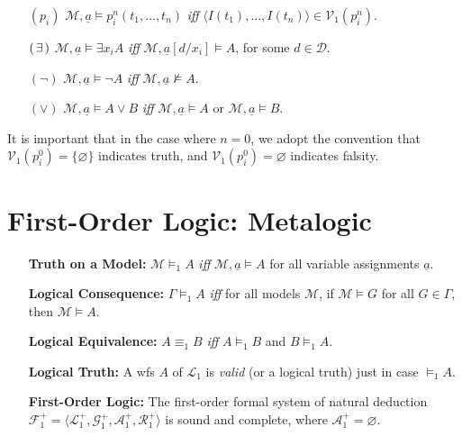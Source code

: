 \documentclass[a4paper, 11pt]{article} %
\newcommand{\tuple}[1]{\langle#1\rangle} %
\newcommand{\set}[1]{\lbrace#1\rbrace} %
\newcommand{\M}[0]{\mathcal{M}}
\newcommand{\V}[0]{\mathcal{V}}
\renewcommand{\L}[0]{\mathcal{L}}
\begin{document}
\begin{enumerate}[leftmargin=1.2in,labelsep=.15in]
\begin{small}
\begin{itemize}[leftmargin=.36in]
\item[$(p_i)$] $\mathcal{M},\underline{a}\vDash  p_i^n(t_1,\dots,t_n)$ \textit{iff} $\tuple{I(t_1),\dots,I(t_n)}\in \V_1(p_i^n)$.
\item[$(\hspace{1.5pt}\exists\hspace{1.5pt})$] $\mathcal{M},\underline{a}\vDash  \exists x_iA$ \textit{iff} $\mathcal{M},\underline{a}[d/x_i]\vDash A$, for some $d\in\mathcal{D}$.
\item[$(\neg)$] $\mathcal{M},\underline{a}\vDash  \neg A$ \textit{iff} $\mathcal{M},\underline{a}\nvDash A$.
\item[$(\vee)$] $\mathcal{M},\underline{a}\vDash  A\vee B$ \textit{iff} $\mathcal{M},\underline{a}\vDash  A$ or $\mathcal{M},\underline{a}\vDash  B$.
\end{itemize}
\end{small}
It is important that in the case where $n=0$, we adopt the convention that $\V_1(p_i^0)=\set{\varnothing}$ indicates truth, and $\V_1(p_i^0)=\varnothing$ indicates falsity.
\end{enumerate}



\section*{\sc First-Order Logic: Metalogic}%

\begin{enumerate}[leftmargin=1.2in,labelsep=.15in] %
\item[\bf Truth on a Model:] $\M\vDash_1 A$ \textit{iff} $\mathcal{M},\underline{a}\vDash A$ for all variable assignments $\underline{a}$.
\item[\bf Logical Consequence:] $\Gamma\vDash_1 A$ \textit{iff} for all models $\M$, if $\mathcal{M}\vDash G$ for all $G\in\Gamma$, then $\mathcal{M}\vDash A$.
\item[\bf Logical Equivalence:] $A\equiv_1 B$ \textit{iff} $A\vDash_1 B$ and $B\vDash_1 A$.  
\item[\bf Logical Truth:] A wfs $A$ of $\L_1$ is \textit{valid} (or a logical truth) just in case $\vDash_1 A$.
\item[\bf First-Order Logic:] The first-order formal system of natural deduction $\mathcal{F}_1^+=\tuple{\L_1^+,\mathcal{G}_1^+,\mathcal{A}_1^+,\mathcal{R}_1^+}$ is sound and complete, where $\mathcal{A}_1^+=\varnothing$.
\end{enumerate}
\end{document}
